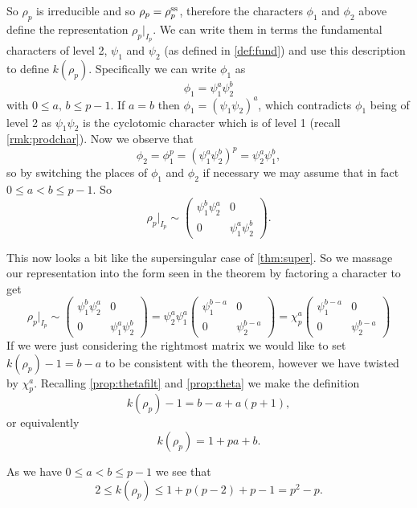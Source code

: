 \documentclass[a4paper,12pt]{article}
\begin{document}
So $\rho_p$ is irreducible and so $\rho_p = \rho^\text{ss}_p$, therefore the characters $\phi_1$ and $\phi_2$ above define the representation $\rho_p|_{I_{p}}$.
We can write them in terms the fundamental characters of level 2, $\psi_1$ and $\psi_2$ (as defined in \cref{def:fund}) and use this description to define $k(\rho_p)$.
Specifically we can write $\phi_1$ as
\[
\phi_1 = \psi_1^a\psi_2^b
\]
with $0\le a,\,b\le p-1$.
If $a = b$ then $\phi_1 = (\psi_1 \psi_2)^a$, which contradicts $\phi_1$ being of level 2 as $\psi_1\psi_2$ is the cyclotomic character which is of level 1 (recall \cref{rmk:prodchar}).
Now we observe that
\[
\phi_2 = \phi_1^p = (\psi_1^a\psi_2^b)^p = \psi_2^a\psi_1^b,
\]
so by switching the places of $\phi_1$ and $\phi_2$ if necessary we may assume that in fact $0\le a < b\le p-1$.
So
\[
\rho_p|_{I_{p}} \sim
\begin{pmatrix}
\psi_1^b\psi_2^a & 0 \\
0                & \psi_1^a\psi_2^b
\end{pmatrix}.
\]

This now looks a bit like the supersingular case of \cref{thm:super}.
So we massage our representation into the form seen in the theorem by factoring a character to get
\[
\rho_p|_{I_{p}} \sim
\begin{pmatrix}
\psi_1^b\psi_2^a & 0 \\
0                & \psi_1^a\psi_2^b
\end{pmatrix} =
\psi_2^a\psi_1^a\begin{pmatrix}
\psi_1^{b-a} & 0 \\
0            & \psi_2^{b-a}
\end{pmatrix} =
\chi_p^a\begin{pmatrix}
\psi_1^{b-a} & 0 \\
0            & \psi_2^{b-a}
\end{pmatrix}
\]
If we were just considering the rightmost matrix we would like to set $k(\rho_p) - 1 = b - a$ to be consistent with the theorem, however we have twisted by $\chi_p^a$.
Recalling \cref{prop:thetafilt} and \cref{prop:theta} we make the definition
\[
k(\rho_p) - 1 = b - a + a(p+1),
\]
or equivalently
\begin{equation}\label{eq:l2}
k(\rho_p) = 1 + pa + b.
\end{equation}

As we have $0 \le a< b \le p-1$ we see that
\[
2\le k(\rho_p) \le 1 + p(p-2) + p-1 = p^2-p.
\]
\end{document}
